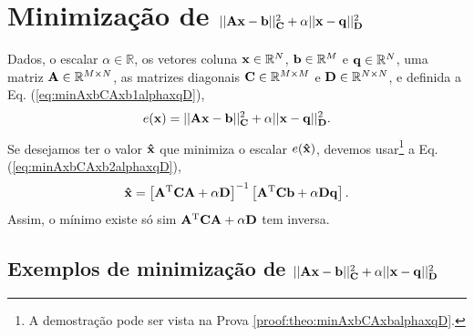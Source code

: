 \section{Minimização de $||\MATRIX{A}\VECTOR{x}-\VECTOR{b}||_{\MATRIX{C}}^2+\alpha ||\VECTOR{x}-\VECTOR{q}||_{\MATRIX{D}}^2$
}



\begin{theorem}\label{theo:minAxbCAxbplusalphaxqD}
Dados,
o escalar $\alpha \in \mathbb{R}$, 
os vetores coluna $\VECTOR{x}\in \mathbb{R}^N$, 
$\VECTOR{b}\in \mathbb{R}^M$ e
$\VECTOR{q}\in \mathbb{R}^N$,  
uma matriz $\MATRIX{A} \in \mathbb{R}^{M\times N}$, 
as matrizes diagonais $\MATRIX{C} \in \mathbb{R}^{M\times M}$ e
$\MATRIX{D} \in \mathbb{R}^{N\times N}$, e 
definida a Eq. (\ref{eq:minAxbCAxb1alphaxqD}),
\begin{equation}\label{eq:minAxbCAxb1alphaxqD}
e(\VECTOR{x})  = ||\MATRIX{A}\VECTOR{x}-\VECTOR{b}||_{\MATRIX{C}}^2 +\alpha ||\VECTOR{x}-\VECTOR{q}||_{\MATRIX{D}}^2.
\end{equation}
Se desejamos ter o valor $\VECTOR{\hat{x}}$ que minimiza o escalar $e(\VECTOR{\hat{x}})$,
devemos usar\footnote{A demostração pode ser vista na Prova \ref{proof:theo:minAxbCAxbalphaxqD}.} a Eq. (\ref{eq:minAxbCAxb2alphaxqD}),
\begin{equation}\label{eq:minAxbCAxb2alphaxqD}
\VECTOR{\hat{x}}=\left[ \MATRIX{A}^{\transpose}\MATRIX{C}\MATRIX{A} +\alpha\MATRIX{D}\right]^{-1} 
\left[ \MATRIX{A}^{\transpose}\MATRIX{C} \VECTOR{b}+\alpha\MATRIX{D}\VECTOR{q}\right].
\end{equation}
Assim, o mínimo existe só sim $\MATRIX{A}^{\transpose}\MATRIX{C}\MATRIX{A} +\alpha\MATRIX{D}$ tem inversa.
\end{theorem}



\subsection{Exemplos de minimização de 
$||\MATRIX{A}\VECTOR{x}-\VECTOR{b}||_{\MATRIX{C}}^2+\alpha ||\VECTOR{x}-\VECTOR{q}||_{\MATRIX{D}}^2$}

